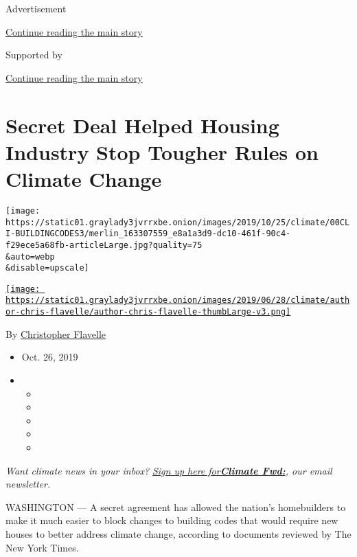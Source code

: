 Advertisement

\protect\hyperlink{after-top}{Continue reading the main story}

Supported by

\protect\hyperlink{after-sponsor}{Continue reading the main story}

\hypertarget{secret-deal-helped-housing-industry-stop-tougher-rules-on-climate-change}{%
\section{Secret Deal Helped Housing Industry Stop Tougher Rules on
Climate
Change}\label{secret-deal-helped-housing-industry-stop-tougher-rules-on-climate-change}}

\texttt{[image: https://static01.graylady3jvrrxbe.onion/images/2019/10/25/climate/00CLI-BUILDINGCODES3/merlin\_163307559\_e8a1a3d9-dc10-461f-90c4-f29ece5a68fb-articleLarge.jpg?quality=75\\\&auto=webp\\\&disable=upscale]}

\href{https://www.nytimes3xbfgragh.onion/by/christopher-flavelle}{\texttt{[image: https://static01.graylady3jvrrxbe.onion/images/2019/06/28/climate/author-chris-flavelle/author-chris-flavelle-thumbLarge-v3.png]}}

By
\href{https://www.nytimes3xbfgragh.onion/by/christopher-flavelle}{Christopher
Flavelle}

\begin{itemize}
\item
  Oct. 26, 2019
\item
  \begin{itemize}
  \item
  \item
  \item
  \item
  \item
  \end{itemize}
\end{itemize}

\emph{Want climate news in your inbox?}
\href{https://www.nytimes3xbfgragh.onion/newsletters/climate-change}{\emph{Sign
up here
for}}\textbf{\href{https://www.nytimes3xbfgragh.onion/newsletters/climate-change}{\emph{Climate
Fwd:}}}\emph{, our email newsletter.}

WASHINGTON --- A secret agreement has allowed the nation's homebuilders
to make it much easier to block changes to building codes that would
require new houses to better address climate change, according to
documents reviewed by The New York Times.

